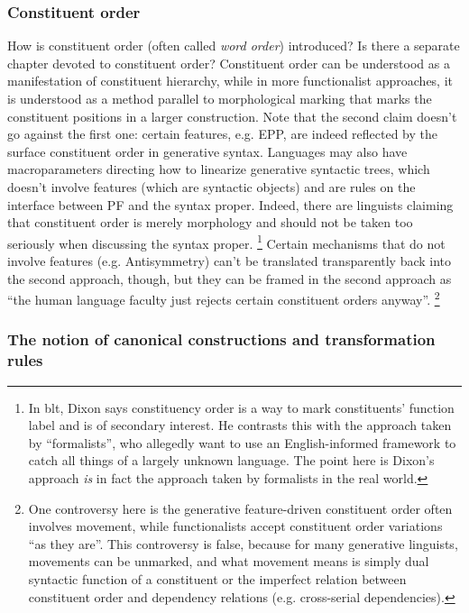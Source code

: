 \documentclass[UTF8, a4paper, oneside, scheme=plain]{ctexart}
\newcommand*{\term}[1]{\emph{#1}}
\begin{document}
\subsubsection{Constituent order}

How is constituent order (often called \term{word order}) introduced?
Is there a separate chapter devoted to constituent order?
Constituent order can be understood as a manifestation of constituent hierarchy,
while in more functionalist approaches, 
it is understood as a method parallel to morphological marking that 
marks the constituent positions in a larger construction.
Note that the second claim doesn't go against the first one:
certain features, e.g. EPP, 
are indeed reflected by the surface constituent order in generative syntax.
Languages may also have macroparameters directing how to linearize generative syntactic trees,
which doesn't involve features (which are syntactic objects) 
and are rules on the interface between PF and the syntax proper.
Indeed, there are linguists claiming that constituent order is merely morphology 
and should not be taken too seriously when discussing the syntax proper.%
\footnote{
    In \ac{blt}, Dixon says constituency order is a way 
    to mark constituents' function label and is of secondary interest.
    He contrasts this with the approach taken by ``formalists'',
    who allegedly want to use an English-informed framework to catch all things 
    of a largely unknown language.
    The point here is Dixon's approach \emph{is} in fact 
    the approach taken by formalists in the real world. 
}
Certain mechanisms that do not involve features (e.g. Antisymmetry)
can't be translated transparently back into the second approach, though,
but they can be framed in the second approach as 
``the human language faculty just rejects certain constituent orders anyway''.%
\footnote{
    One controversy here is the generative feature-driven constituent order often involves movement,
    while functionalists accept constituent order variations ``as they are''.
    This controversy is false, because for many generative linguists, 
    movements can be unmarked, and what movement means is simply 
    dual syntactic function of a constituent 
    or the imperfect relation between constituent order and dependency relations
    (e.g. cross-serial dependencies).
}

\subsubsection{The notion of canonical constructions and transformation rules}
\end{document}
